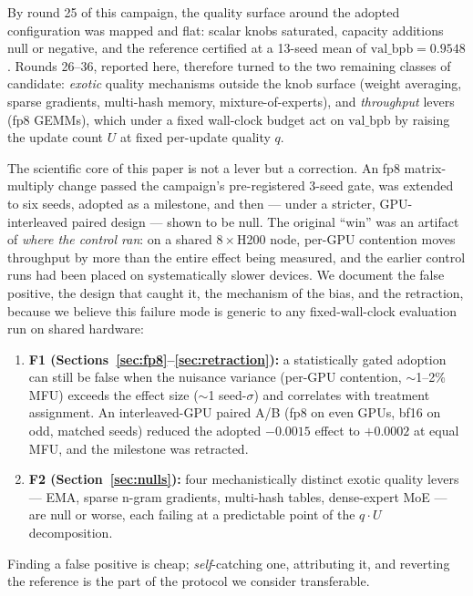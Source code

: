\documentclass{article}
\newcommand{\valbpb}{\mathrm{val\_bpb}}
\begin{document}
By round 25 of this campaign, the quality surface around the adopted configuration was mapped and flat: scalar knobs saturated, capacity additions null or negative, and the reference certified at a 13-seed mean of $\valbpb = 0.9548$ \cite{ophis2026capstone}. Rounds 26--36, reported here, therefore turned to the two remaining classes of candidate: \emph{exotic} quality mechanisms outside the knob surface (weight averaging, sparse gradients, multi-hash memory, mixture-of-experts), and \emph{throughput} levers (fp8 GEMMs), which under a fixed wall-clock budget act on $\valbpb$ by raising the update count $U$ at fixed per-update quality $q$.

The scientific core of this paper is not a lever but a correction. An fp8 matrix-multiply change passed the campaign's pre-registered 3-seed gate, was extended to six seeds, adopted as a milestone, and then --- under a stricter, GPU-interleaved paired design --- shown to be null. The original ``win'' was an artifact of \emph{where the control ran}: on a shared $8\times$H200 node, per-GPU contention moves throughput by more than the entire effect being measured, and the earlier control runs had been placed on systematically slower devices. We document the false positive, the design that caught it, the mechanism of the bias, and the retraction, because we believe this failure mode is generic to any fixed-wall-clock evaluation run on shared hardware:

\begin{enumerate}
    \item \textbf{F1 (Sections~\ref{sec:fp8}--\ref{sec:retraction}):} a statistically gated adoption can still be false when the nuisance variance (per-GPU contention, $\sim$1--2\% MFU) exceeds the effect size ($\sim$1 seed-$\sigma$) and correlates with treatment assignment. An interleaved-GPU paired A/B (fp8 on even GPUs, bf16 on odd, matched seeds) reduced the adopted $-0.0015$ effect to $+0.0002$ at equal MFU, and the milestone was retracted.
    \item \textbf{F2 (Section~\ref{sec:nulls}):} four mechanistically distinct exotic quality levers --- EMA, sparse n-gram gradients, multi-hash tables, dense-expert MoE --- are null or worse, each failing at a predictable point of the $q \cdot U$ decomposition.
\end{enumerate}

Finding a false positive is cheap; \emph{self}-catching one, attributing it, and reverting the reference is the part of the protocol we consider transferable.
\end{document}
